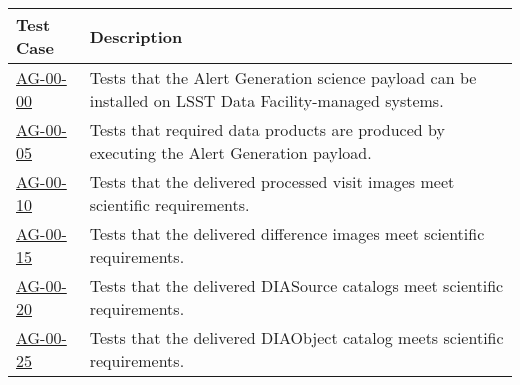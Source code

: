 \begin{longtable} {|p{}|p{}|}\hline
\textbf{Test Case}  & \textbf{Description} \\\hline

\hyperref[ag-00-00]{AG-00-00} & Tests that the Alert Generation science payload can be installed on LSST Data Facility-managed systems.\\\hline
\hyperref[ag-00-05]{AG-00-05} & Tests that required data products are
produced by executing the Alert Generation payload. \\\hline
\hyperref[ag-00-10]{AG-00-10} & Tests that the delivered processed visit images meet scientific requirements. \\\hline
\hyperref[ag-00-15]{AG-00-15} & Tests that the delivered difference images meet scientific requirements. \\\hline
\hyperref[ag-00-20]{AG-00-20} & Tests that the delivered DIASource catalogs meet scientific requirements. \\\hline
\hyperref[ag-00-25]{AG-00-25} & Tests that the delivered DIAObject
	catalog meets scientific requirements. \\\hline
\end{longtable}
